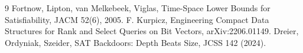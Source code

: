 \documentclass[10pt]{article}
\begin{document}
\begin{thebibliography}{9}
 Fortnow, Lipton, van Melkebeek, Viglas, Time-Space Lower Bounds for Satisfiability, JACM 52(6), 2005.
 F. Kurpicz, Engineering Compact Data Structures for Rank and Select Queries on Bit Vectors, arXiv:2206.01149.
 Dreier, Ordyniak, Szeider, SAT Backdoors: Depth Beats Size, JCSS 142 (2024).
\end{thebibliography}
\end{document}
